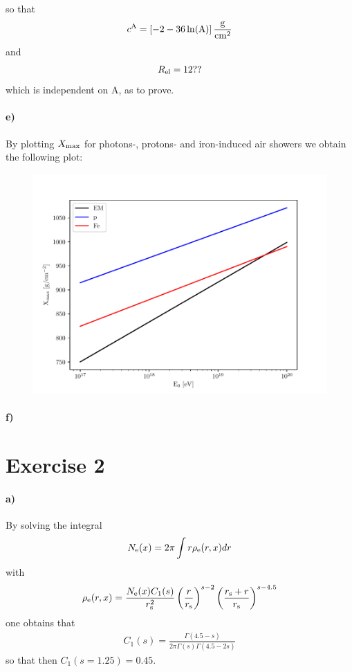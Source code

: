 \documentclass{article}
\begin{document}
so that 
\begin{align}
c^{\rm A}=\left[-2-36\ln({\rm A})\right]\frac{{\rm g}}{{\rm cm}^2}
\end{align}
and 
\begin{align}
R_{\rm el}=12??
\end{align}
which is independent on A, as to prove. 

\pagebreak
\paragraph{e)}
By plotting $X_{\rm max}$ for photons-, protons- and iron-induced air showers we obtain the following plot:
\begin{figure}[h]
\centering
\includegraphics[height=6 cm, width=8 cm]{plot_ex_1e.pdf}
\end{figure}

\paragraph{f)}

\section*{Exercise 2}
\paragraph{a)}
By solving the integral 
\begin{align}
N_{\rm e}(x)=2\pi\int r \rho_{\rm e}(r,x)dr
\end{align}
with 
\begin{align}
\rho_{\rm e}(r,x)=\frac{N_{\rm e}(x)C_1(s)}{r_{\rm s}^{2}}\left(\frac{r}{r_{\rm s}}\right)^{s-2}\left(\frac{r_{\rm s}+r}{r_{\rm s}}\right)^{s-4.5}
\end{align}
one obtains that
\begin{align}
C_1(s)=\frac{\Gamma(4.5-s)}{2\pi \Gamma(s)\Gamma(4.5-2s)}
\end{align}
so that then $C_1(s=1.25)=0.45$.
\end{document}

